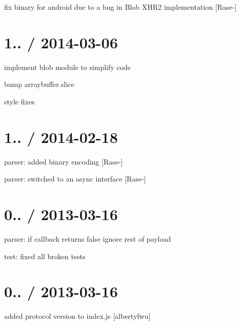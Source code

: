 \begin{DoxyItemize}
\item fix binary for android due to a bug in Blob X\+H\+R2 implementation \mbox{[}Rase-\/\mbox{]}
\end{DoxyItemize}

\section*{1.. / 2014-\/03-\/06 }


\begin{DoxyItemize}
\item implement {\ttfamily blob} module to simplify code
\item bump {\ttfamily arraybuffer.\+slice}
\item style fixes
\end{DoxyItemize}

\section*{1.. / 2014-\/02-\/18 }


\begin{DoxyItemize}
\item parser\+: added binary encoding \mbox{[}Rase-\/\mbox{]}
\item parser\+: switched to an async interface \mbox{[}Rase-\/\mbox{]}
\end{DoxyItemize}

\section*{0.. / 2013-\/03-\/16 }


\begin{DoxyItemize}
\item parser\+: if callback returns {\ttfamily false} ignore rest of payload
\item test\+: fixed all broken tests
\end{DoxyItemize}

\section*{0.. / 2013-\/03-\/16 }


\begin{DoxyItemize}
\item added protocol version to index.\+js \mbox{[}albertyfwu\mbox{]}
\end{DoxyItemize}

